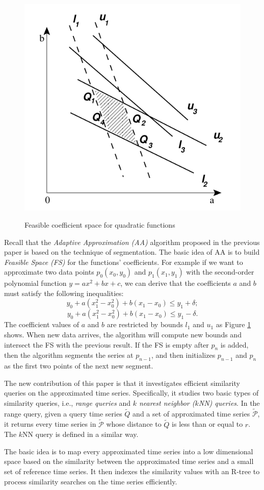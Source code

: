 \documentclass[paper=a4, fontsize=18pt]{article} %
\numberwithin{equation}{section} %
\numberwithin{figure}{section} %
\numberwithin{table}{section} %
\newcommand{\mP}{\mathcal{P}}
\begin{document}
\begin{figure}[h]
  \centering
  \includegraphics[width=.5\linewidth]{7_11_space.png}\\
  \caption{Feasible coefficient space for quadratic functions}\label{fig:space}
\end{figure}

Recall that the \emph{Adaptive Approximation (AA)} algorithm proposed in the previous paper is based on the technique of segmentation. The basic idea of AA  is to build \emph{Feasible Space (FS)} for the functions' coefficients. For example if we want to approximate two data points $p_0(x_0, y_0)$ and $p_1(x_1, y_1)$ with the second-order polynomial function $y = ax^2 + bx + c$, we can derive that the coefficients $a$ and $b$ must satisfy the following inequalities:
$$y_0 + a(x_1^2-x_0^2) + b(x_1-x_0) \leq y_1 + \delta;$$
$$y_0 + a(x_1^2-x_0^2) + b(x_1-x_0) \leq y_1 - \delta.$$
The coefficient values of $a$ and $b$ are restricted by bounds $l_1$ and $u_1$ as Figure \ref{fig:space} shows. When new data arrives, the algorithm will compute new bounds and intersect the FS with the previous result. If the FS is empty after $p_n$ is added, then the algorithm segments the series at $p_{n-1}$, and then initializes $p_{n-1}$ and $p_n$ as the first two points of the next new segment.

The new contribution of this paper is that it investigates efficient similarity queries on the approximated time series. Specifically, it studies two basic types of similarity queries, i.e., \emph{range queries} and \emph{$k$ nearest neighbor ($k$NN) queries}. In the range query, given a query time series $\tilde{Q}$ and a set of approximated time series $\tilde{\mP}$, it returns every time series in $\tilde{\mP}$ whose distance to $\tilde{Q}$ is less than or equal to $r$. The $k$NN query is defined in a similar way.

The basic idea is to map every approximated time series into a low dimensional space based on the similarity between the approximated time series and a small set of reference time series. It then indexes the similarity values with an R-tree to process similarity searches on the time series efficiently.
\end{document}
